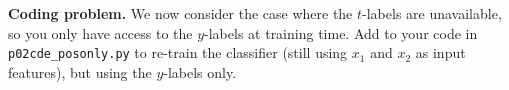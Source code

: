 \clearpage
\item {} \textbf{Coding problem.}
We now consider the case where the $t$-labels are unavailable, so you only have
access to the $y$-labels at training time. Add to your code in
\texttt{p02cde\_posonly.py} to re-train the classifier (still using $x_1$ and
$x_2$ as input features), but using the $y$-labels only.

\ifnum{} {
  
} \fi
